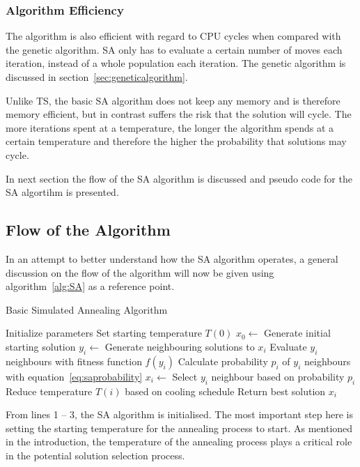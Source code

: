 \subsubsection{Algorithm Efficiency}
The algorithm is also efficient with regard to CPU cycles when compared with the genetic algorithm. SA only has to evaluate a certain number of moves each iteration, instead of a whole population each iteration. The genetic algorithm is discussed in section~\ref{sec:geneticalgorithm}.

Unlike TS, the basic SA algorithm does not keep any memory and is therefore memory efficient, but in contrast suffers the risk that the solution will cycle. The more iterations spent at a temperature, the longer the algorithm spends at a certain temperature and therefore the higher the probability that solutions may cycle.

In next section the flow of the SA algorithm is discussed and pseudo code for the SA algortihm is presented.

\subsection{Flow of the Algorithm}
In an attempt to better understand how the SA algorithm operates, a general discussion on the flow of the algorithm will now be given using algorithm~\ref{alg:SA} as a reference point.
\begin{algorithm}[H]
\caption{Basic Simulated Annealing Algorithm\cite{VeryFastSAImageEnchancement,ChaosSA}}
\label{alg:SA}
	\begin{algorithmic}[1]
		\State Initialize parameters
		\State Set starting temperature $T(0)$
		\State $x_0 \leftarrow$ Generate initial starting solution
			\State $y_i \leftarrow$ Generate neighbouring solutions to $x_i$
			\State Evaluate $y_i$ neighbours with fitness function $f(y_i)$
			\State Calculate probability $p_i$ of $y_i$ neighbours with equation~\ref{eq:saprobability}
			\State $x_i \leftarrow$ Select $y_i$ neighbour based on probability $p_i$
			\State Reduce temperature $T(i)$ based on cooling schedule
		\EndWhile
		\State Return best solution $x_i$
	\end{algorithmic}
\end{algorithm}

From lines 1 -- 3, the SA algorithm is initialised. The most important step here is setting the starting temperature for the annealing process to start. As mentioned in the introduction, the temperature of the annealing process plays a critical role in the potential solution selection process.

